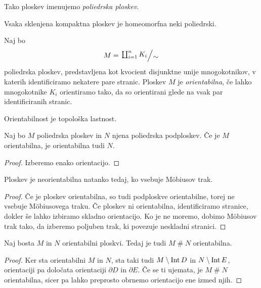 \begin{opomba}
Tako ploskev imenujemo \emph{poliedrska ploskev}.
\end{opomba}

\begin{izrek}[Radó]
Vsaka sklenjena kompaktna ploskev je homeomorfna neki poliedrski.
\end{izrek}

\begin{definicija}
Naj bo
\[
M = \kvoc{\coprod_{i=1}^n K_i}{\sim}
\]
poliedrska ploskev, predstavljena kot kvocient disjunktne unije
mnogokotnikov, v katerih identificiramo nekatere pare stranic.
Ploskev $M$ je \emph{orientabilna},
če lahko mnogokotnike $K_i$ orientiramo tako, da so orientirani
glede na vsak par identificiranih stranic.
\end{definicija}

\begin{izrek}
Orientabilnost je topološka lastnost.
\end{izrek}

\begin{trditev}
Naj bo $M$ poliedrska ploskev in $N$ njena poliedrska podploskev.
Če je $M$ orientabilna, je orientabilna tudi $N$.
\end{trditev}

\begin{proof}
Izberemo enako orientacijo.
\end{proof}

\begin{posledica}
Ploskev je neorientabilna natanko tedaj, ko vsebuje Möbiusov trak.
\end{posledica}

\begin{proof}
Če je ploskev orientabilna, so tudi podploskve orientabilne, torej
ne vsebuje Möbiusovega traku. Če ploskev ni orientabilna,
identificiramo stranice, dokler še lahko izbiramo skladno
orientacijo. Ko je ne moremo, dobimo Möbiusov trak tako, da
izberemo poljuben trak, ki povezuje neskladni stranici.
\end{proof}

\begin{trditev}
Naj bosta $M$ in $N$ orientabilni ploskvi. Tedaj je tudi
$M \mathbin{\#} N$ orientabilna.
\end{trditev}

\begin{proof}
Ker sta orientabilni $M$ in $N$, sta taki tudi $M \setminus \operatorname{Int} D$
in $N \setminus \operatorname{Int} E$, orientaciji pa določata orientaciji
$\partial D$ in $\partial E$. Če se ti ujemata, je
$M \mathbin{\#} N$ orientabilna, sicer pa lahko preprosto obrnemo
orientacijo ene izmed njih.
\end{proof}

